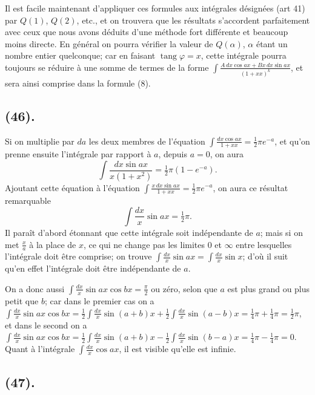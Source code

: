 \documentclass{article}
\begin{document}
Il est facile maintenant d'appliquer ces formules aux intégrales désignées (art 41) par $Q(1)$, $Q(2)$, etc., et on trouvera que les résultats s'accordent parfaitement avec ceux que nous avons déduits d'une méthode fort différente et beaucoup moins directe. En général on pourra vérifier la valeur de $Q(\alpha)$, $\alpha$ étant un nombre entier quelconque; car en faisant $\operatorname{tang}\varphi=x$, cette intégrale pourra toujours se réduire à une somme de termes de la forme $\displaystyle\int\frac{A\,dx\cos ax+Bx\,dx\sin ax}{(1+xx)^{k}}$, et sera ainsi comprise dans la formule (8).

\subsection*{(46).}

Si on multiplie par $da$ les deux membres de l'équation $\displaystyle\int\frac{dx\cos ax}{1+xx}=\tfrac{1}{2}\pi e^{-a}$, et qu'on prenne ensuite l'intégrale par rapport à $a$, depuis $a=0$, on aura
\[ \int\frac{dx\sin ax}{x(1+x^{2})}=\tfrac{1}{2}\pi(1-e^{-a}). \]
Ajoutant cette équation à l'équation $\displaystyle\int\frac{x\,dx\sin ax}{1+xx}=\tfrac{1}{2}\pi e^{-a}$, on aura ce résultat remarquable
\[ \int\frac{dx}{x}\sin ax=\tfrac{1}{2}\pi. \tag{9} \]
Il paraît d'abord étonnant que cette intégrale soit indépendante de $a$; mais si on met $\frac{x}{a}$ à la place de $x$, ce qui ne change pas les limites $0$ et $\infty$ entre lesquelles l'intégrale doit être comprise; on trouve $\displaystyle\int\frac{dx}{x}\sin ax=\int\frac{dx}{x}\sin x$; d'où il suit qu'en effet l'intégrale doit être indépendante de $a$.


On a donc aussi $\displaystyle\int\frac{dx}{x}\sin ax\cos bx=\frac{\pi}{2}$ ou zéro, selon que $a$ est plus grand ou plus petit que $b$; car dans le premier cas on a $\displaystyle\int\frac{dx}{x}\sin ax\cos bx=\tfrac{1}{2}\int\frac{dx}{x}\sin(a+b)x+\tfrac{1}{2}\int\frac{dx}{x}\sin(a-b)x=\tfrac{1}{4}\pi+\tfrac{1}{4}\pi=\tfrac{1}{2}\pi$, et dans le second on a $\displaystyle\int\frac{dx}{x}\sin ax\cos bx=\tfrac{1}{2}\int\frac{dx}{x}\sin(a+b)x-\tfrac{1}{2}\int\frac{dx}{x}\sin(b-a)x=\tfrac{1}{4}\pi-\tfrac{1}{4}\pi=0$. Quant à l'intégrale $\displaystyle\int\frac{dx}{x}\cos ax$, il est visible qu'elle est infinie.

\subsection*{(47).}
\end{document}
